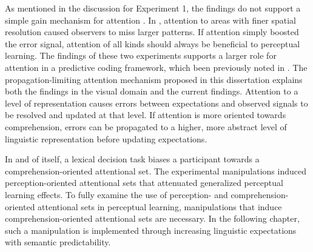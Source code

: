 As mentioned in the discussion for Experiment 1, the findings do not support a simple gain mechanism for attention \citep[contra][]{Clark2013}.  
In \citet{Yeshurun1998}, attention to areas with finer spatial resolution caused observers to miss larger patterns.  
If attention simply boosted the error signal, attention of all kinds should always be beneficial to perceptual learning.
The findings of these two experiments supports a larger role for attention in a predictive coding framework, which been previously noted in \citet{Block2013}.
The propagation-limiting attention mechanism proposed in this dissertation explains both the findings in the visual domain and the current findings.
Attention to a level of representation causes errors between expectations and observed signals to be resolved and updated at that level.
If attention is more oriented towards comprehension, errors can be propagated to a higher, more abstract level of linguistic representation before updating expectations.

In and of itself, a lexical decision task biases a participant towards a comprehension-oriented attentional set.
The experimental manipulations induced perception-oriented attentional sets that attenuated generalized perceptual learning effects.
To fully examine the use of perception- and comprehension-oriented attentional sets in perceptual learning, manipulations that induce comprehension-oriented attentional sets are necessary.
In the following chapter, such a manipulation is implemented through increasing linguistic expectations with semantic predictability.




